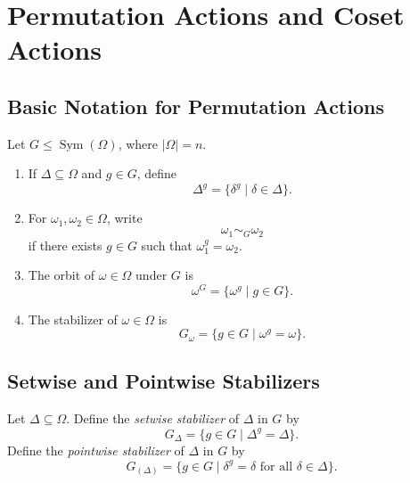 
\providecommand{\Sym}{\operatorname{Sym}}
\providecommand{\Core}{\operatorname{Core}}
\providecommand{\Fix}{\operatorname{Fix}}

\chapter{Permutation Actions and Coset Actions}
\label{chap:permutation-actions}


\section{Basic Notation for Permutation Actions}

\begin{definition}
Let \(G\leq \Sym(\Omega)\), where \(|\Omega|=n\).

\begin{enumerate}[label=\textup{(\arabic*)}]
    \item If \(\Delta\subseteq \Omega\) and \(g\in G\), define
    \[
        \Delta^g=\{\delta^g\mid \delta\in \Delta\}.
    \]

    \item For \(\omega_1,\omega_2\in \Omega\), write
    \[
        \omega_1\sim_G \omega_2
    \]
    if there exists \(g\in G\) such that \(\omega_1^g=\omega_2\).

    \item The orbit of \(\omega\in \Omega\) under \(G\) is
    \[
        \omega^G=\{\omega^g\mid g\in G\}.
    \]

    \item The stabilizer of \(\omega\in\Omega\) is
    \[
        G_\omega=\{g\in G\mid \omega^g=\omega\}.
    \]
\end{enumerate}
\end{definition}


\section{Setwise and Pointwise Stabilizers}

\begin{definition}
Let \(\Delta\subseteq \Omega\). Define the \emph{setwise stabilizer} of \(\Delta\) in \(G\) by
\[
    G_\Delta=\{g\in G\mid \Delta^g=\Delta\}.
\]
Define the \emph{pointwise stabilizer} of \(\Delta\) in \(G\) by
\[
    G_{(\Delta)}
    =
    \{g\in G\mid \delta^g=\delta \text{ for all } \delta\in\Delta\}.
\]
\end{definition}

